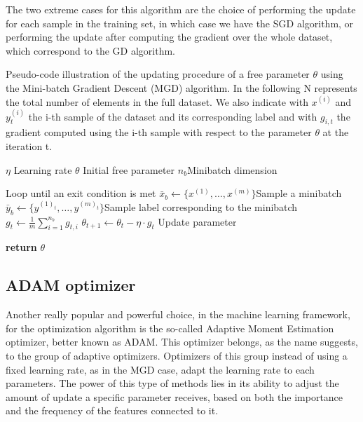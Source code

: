 The two extreme cases for this algorithm are the choice of performing the update for each sample in the training set, in which case we have the SGD algorithm, or performing the update after computing the gradient over the whole dataset, which correspond to the GD algorithm. 

\medskip

\begin{algorithm}[H]
\caption{Pseudo-code illustration of the updating procedure of a free parameter $\theta$ using the Mini-batch Gradient Descent (MGD) algorithm. In the following N represents the total number of elements in the full dataset. We also indicate with $x^{(i)}$ and $y^{(i)}_t$ the i-th sample of the dataset and its corresponding label and with $g_{i,t}$ the gradient computed using the i-th sample with respect to the parameter $\theta$ at the iteration t. }
\label{alg:mgd}
\begin{algorithmic}[1]
\Require $\eta$ \Comment Learning rate
\Require ${\theta}$ \Comment Initial free parameter
\Require $n_b$\Comment Minibatch dimension 

 \Comment Loop until an exit condition is met
\State $\bar{x}_b \gets \{x^{(1)},\dots,x^{(m)}\}$\Comment Sample a minibatch
\State $\bar{y}_b \gets \{y^{(1)_t},\dots,y^{(m)_t}\}$\Comment Sample label corresponding to the minibatch
\State ${g}_t \gets  \frac{1}{m} \sum_{i=1}^{n_b} g_{t,i}$ 
\State $\theta_{t+1} \gets \theta_t - \eta\cdot {g}_t$ \Comment Update parameter
\EndWhile

\State \textbf{return} ${\theta}$
\EndProcedure
\end{algorithmic}
\end{algorithm}



\subsection{ADAM optimizer}
\label{adam}
Another really popular and powerful choice, in the machine learning framework, for the optimization algorithm is the so-called Adaptive Moment Estimation optimizer, better known as ADAM\cite{adam}. This optimizer belongs, as the name suggests, to the group of adaptive optimizers. Optimizers of this group instead of using a fixed learning rate, as in the MGD case, adapt the learning rate to each parameters.
The power of this type of methods lies in its ability to adjust the amount of update a specific parameter receives, based on both the importance and the frequency of the features connected to it. 

